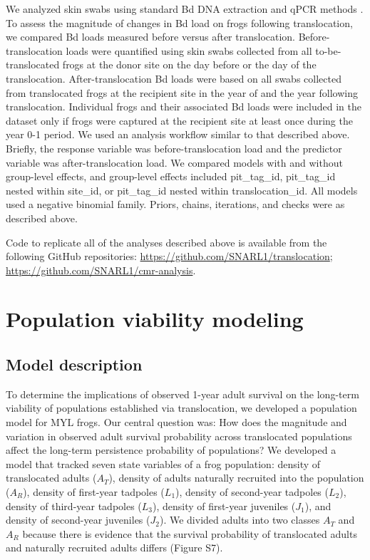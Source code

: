 \documentclass[9pt,twocolumn,twoside,lineno]{pnas-new}
\begin{document}
{We analyzed skin swabs using standard Bd DNA extraction and qPCR methods
\citep[see SI Appendix for details]{boyle2004}. To assess the magnitude
of changes in Bd load on frogs following translocation, we compared Bd
loads measured before versus after translocation. Before-translocation
loads were quantified using skin swabs collected from all
to-be-translocated frogs at the donor site on the day before or the day
of the translocation. After-translocation Bd loads were based on all
swabs collected from translocated frogs at the recipient site in the
year of and the year following translocation. Individual frogs and their
associated Bd loads were included in the dataset only if frogs were
captured at the recipient site at least once during the year 0-1 period.
We used an analysis workflow similar to that described above. Briefly,
the response variable was before-translocation load and the predictor
variable was after-translocation load. We compared models with and
without group-level effects, and group-level effects included
pit\_tag\_id, pit\_tag\_id nested within site\_id, or pit\_tag\_id
nested within translocation\_id. All models used a negative binomial
family. Priors, chains, iterations, and checks were as described above.

Code to replicate all of the analyses described above is available from
the following GitHub repositories:
\url{https://github.com/SNARL1/translocation};
\url{https://github.com/SNARL1/cmr-analysis}.

\hypertarget{population-viability-modeling}{%
\section*{Population viability
modeling}\label{population-viability-modeling}}

\hypertarget{model-description}{%
\subsection*{Model description}\label{model-description}}

To determine the implications of observed 1-year adult survival on the
long-term viability of populations established via translocation, we
developed a population model for MYL frogs. Our central question was:
How does the magnitude and variation in observed adult survival
probability across translocated populations affect the long-term
persistence probability of populations? We developed a model that
tracked seven state variables of a frog population: density of
translocated adults (\(A_T\)), density of adults naturally recruited
into the population (\(A_R\)), density of first-year tadpoles (\(L_1\)),
density of second-year tadpoles (\(L_2\)), density of third-year
tadpoles (\(L_3\)), density of first-year juveniles (\(J_1\)), and
density of second-year juveniles (\(J_2\)). We divided adults into two
classes \(A_T\) and \(A_R\) because there is evidence that the survival
probability of translocated adults and naturally recruited adults
differs (Figure S7).

}
\end{document}
